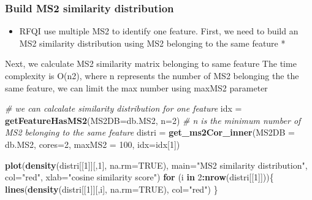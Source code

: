\documentclass[
]{article}
\newenvironment{Shaded}{\begin{snugshade}}{\end{snugshade}}
\newcommand{\CommentTok}[1]{\textcolor[rgb]{0.56,0.35,0.01}{\textit{#1}}}
\newcommand{\ControlFlowTok}[1]{\textcolor[rgb]{0.13,0.29,0.53}{\textbf{#1}}}
\newcommand{\DataTypeTok}[1]{\textcolor[rgb]{0.13,0.29,0.53}{#1}}
\newcommand{\DecValTok}[1]{\textcolor[rgb]{0.00,0.00,0.81}{#1}}
\newcommand{\KeywordTok}[1]{\textcolor[rgb]{0.13,0.29,0.53}{\textbf{#1}}}
\newcommand{\NormalTok}[1]{#1}
\newcommand{\OperatorTok}[1]{\textcolor[rgb]{0.81,0.36,0.00}{\textbf{#1}}}
\newcommand{\OtherTok}[1]{\textcolor[rgb]{0.56,0.35,0.01}{#1}}
\newcommand{\StringTok}[1]{\textcolor[rgb]{0.31,0.60,0.02}{#1}}
\providecommand{\tightlist}{%
  \setlength{\itemsep}{0pt}\setlength{\parskip}{0pt}}
\begin{document}
\hypertarget{build-ms2-similarity-distribution}{%
\subsubsection{Build MS2 similarity
distribution}\label{build-ms2-similarity-distribution}}

\begin{itemize}
\tightlist
\item
  RFQI use multiple MS2 to identify one feature. First, we need to build
  an MS2 similarity distribution using MS2 belonging to the same feature
  *
\end{itemize}

Next, we calculate MS2 similarity matrix belonging to same feature The
time complexity is O(n2), where n represents the number of MS2 belonging
the the same feature, we can limit the max number using maxMS2 parameter

\begin{Shaded}
\begin{Highlighting}[]
\CommentTok{# we can calcalate similarity distribution for one feature}
\NormalTok{idx =}\StringTok{ }\KeywordTok{getFeatureHasMS2}\NormalTok{(}\DataTypeTok{MS2DB=}\NormalTok{db.MS2, }\DataTypeTok{n=}\DecValTok{2}\NormalTok{)  }\CommentTok{# n is the minimum number of MS2 belonging to the same feature}
\NormalTok{distri =}\StringTok{ }\KeywordTok{get_ms2Cor_inner}\NormalTok{(}\DataTypeTok{MS2DB =}\NormalTok{ db.MS2, }\DataTypeTok{cores=}\DecValTok{2}\NormalTok{, }\DataTypeTok{maxMS2 =} \DecValTok{100}\NormalTok{, }\DataTypeTok{idx=}\NormalTok{idx[}\DecValTok{1}\NormalTok{])}
\end{Highlighting}
\end{Shaded}

\begin{Shaded}
\begin{Highlighting}[]
\KeywordTok{plot}\NormalTok{(}\KeywordTok{density}\NormalTok{(distri[[}\DecValTok{1}\NormalTok{]][,}\DecValTok{1}\NormalTok{], }\DataTypeTok{na.rm=}\OtherTok{TRUE}\NormalTok{), }\DataTypeTok{main=}\StringTok{"MS2 similarity distribution"}\NormalTok{, }\DataTypeTok{col=}\StringTok{"red"}\NormalTok{, }\DataTypeTok{xlab=}\StringTok{"cosine similarity score"}\NormalTok{)}
\ControlFlowTok{for}\NormalTok{ (i }\ControlFlowTok{in} \DecValTok{2}\OperatorTok{:}\KeywordTok{nrow}\NormalTok{(distri[[}\DecValTok{1}\NormalTok{]]))\{}
  \KeywordTok{lines}\NormalTok{(}\KeywordTok{density}\NormalTok{(distri[[}\DecValTok{1}\NormalTok{]][,i], }\DataTypeTok{na.rm=}\OtherTok{TRUE}\NormalTok{), }\DataTypeTok{col=}\StringTok{"red"}\NormalTok{)}
\NormalTok{\}}
\end{Highlighting}
\end{Shaded}
\end{document}
